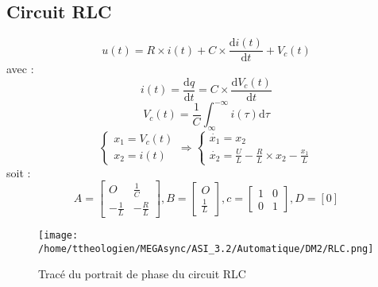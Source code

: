\documentclass[a4paper,12pt]{article}
\begin{document}
    \subsection{Circuit RLC}
    \label{sub:Circuit RLC}
    \[u(t) = R \times i(t) + C \times \frac{\mathrm{d}i(t)}{\mathrm{d}t} + V_c(t)\]
    avec :
    \[i(t) = \frac{\mathrm{d}q}{\mathrm{d}t} = C \times \frac{\mathrm{d}V_c(t)}{\mathrm{d}t}\]
    \[V_c(t) = \frac{1}{C} \int_{\infty}^{-\infty}i(\tau)\mathrm{d}\tau\]
    \[\left\{
              \begin{array}{ll}
                x_1 = V_c(t)\\
                x_2 = i(t)
              \end{array}
      \right.
      \Rightarrow
      \left\{
              \begin{array}{ll}
                \dot{x_1} = x_2\\
                \dot{x_2} = \frac{U}{L} - \frac{R}{L} \times x_2 - \frac{x_1}{L}
              \end{array}
      \right.
      \]
    soit :
    \[ A = \left[
                  \begin{array}{cc}
                    O             & \frac{1}{C}\\
                    -\frac{1}{L}  & -\frac{R}{L}
                  \end{array}
            \right],
        B = \left[
                  \begin{array}{c}
                    O\\
                    \frac{1}{L}
                  \end{array}
            \right],
        c = \left[
                  \begin{array}{cc}
                    1 & 0\\
                    0 & 1
                  \end{array}
            \right],
        D = [0]
    \]

    \begin{figure}[h]
      \caption{Tracé du portrait de phase du circuit RLC}
      \centering
      \texttt{[image: /home/ttheologien/MEGAsync/ASI\_3.2/Automatique/DM2/RLC.png]}
    \end{figure}

    \newpage
\end{document}
